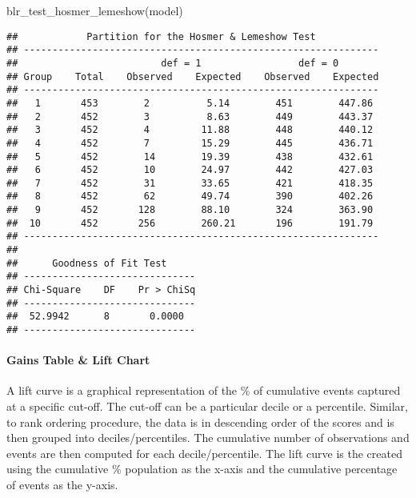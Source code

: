 \documentclass[
]{article}
\newenvironment{Shaded}{\begin{snugshade}}{\end{snugshade}}
\newcommand{\FunctionTok}[1]{\textcolor[rgb]{0.00,0.00,0.00}{#1}}
\newcommand{\NormalTok}[1]{#1}
\begin{document}
\begin{Shaded}
\begin{Highlighting}[]
\FunctionTok{blr\_test\_hosmer\_lemeshow}\NormalTok{(model)}
\end{Highlighting}
\end{Shaded}

\begin{verbatim}
##            Partition for the Hosmer & Lemeshow Test            
## --------------------------------------------------------------
##                         def = 1                 def = 0        
## Group    Total    Observed    Expected    Observed    Expected 
## --------------------------------------------------------------
##   1       453        2          5.14        451        447.86  
##   2       452        3          8.63        449        443.37  
##   3       452        4         11.88        448        440.12  
##   4       452        7         15.29        445        436.71  
##   5       452        14        19.39        438        432.61  
##   6       452        10        24.97        442        427.03  
##   7       452        31        33.65        421        418.35  
##   8       452        62        49.74        390        402.26  
##   9       452       128        88.10        324        363.90  
##  10       452       256        260.21       196        191.79  
## --------------------------------------------------------------
## 
##      Goodness of Fit Test      
## ------------------------------
## Chi-Square    DF    Pr > ChiSq 
## ------------------------------
##  52.9942      8       0.0000   
## ------------------------------
\end{verbatim}

\hypertarget{gains-table-lift-chart}{%
\paragraph{Gains Table \& Lift Chart}\label{gains-table-lift-chart}}

A lift curve is a graphical representation of the \% of cumulative
events captured at a specific cut-off. The cut-off can be a particular
decile or a percentile. Similar, to rank ordering procedure, the data is
in descending order of the scores and is then grouped into
deciles/percentiles. The cumulative number of observations and events
are then computed for each decile/percentile. The lift curve is the
created using the cumulative \% population as the x-axis and the
cumulative percentage of events as the y-axis.
\end{document}
